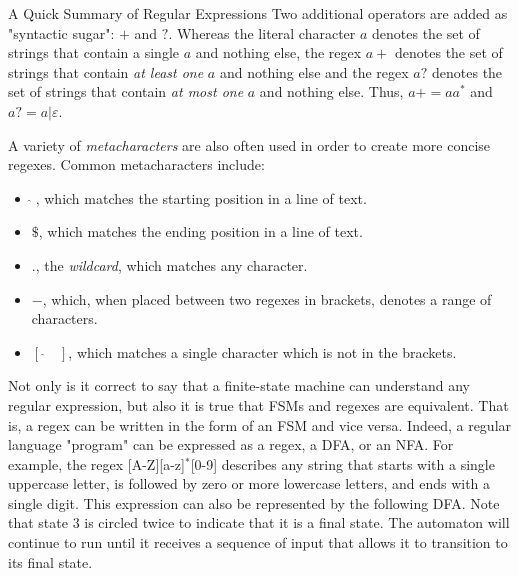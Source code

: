 \begin{bluebox}{A Quick Summary of Regular Expressions}
    Two additional operators are added as "syntactic sugar": $+$ and $?$. Whereas the literal character $a$ denotes the set of strings that contain a single $a$ and nothing else, the regex $a+$ denotes the set of strings that contain \textit{at least one} $a$ and nothing else and the regex $a?$ denotes the set of strings that contain \textit{at most one} $a$ and nothing else. Thus, $a+=aa^*$ and $a?=a|\varepsilon$.
        
    A variety of \textit{metacharacters} are also often used in order to create more concise regexes. Common metacharacters include:
    
    \vspace{4mm}
    \begin{itemize}
        \item $\hat{}\;$, which matches the starting position in a line of text.
        \item $\$$, which matches the ending position in a line of text.
        \item $.$, the \textit{wildcard}, which matches any character.
        \item $-$, which, when placed between two regexes in brackets, denotes a range of characters.
        \item $[\;\hat{}\quad]$, which matches a single character which is not in the brackets.
    \end{itemize}
    \vspace{4mm}

\end{bluebox}

Not only is it correct to say that a finite-state machine can understand any regular expression, but also it is true that FSMs and regexes are equivalent. That is, a regex can be written in the form of an FSM and vice versa. Indeed, a regular language "program" can be expressed as a regex, a DFA, or an NFA. For example, the regex [A-Z][a-z]$^*$[0-9] describes any string that starts with a single uppercase letter, is followed by zero or more lowercase letters, and ends with a single digit. This expression can also be represented by the following DFA. Note that state $3$ is circled twice to indicate that it is a final state. The automaton will continue to run until it receives a sequence of input that allows it to transition to its final state.

